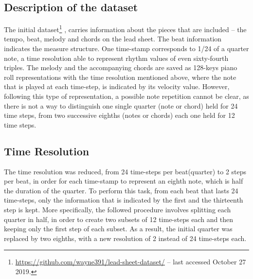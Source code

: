         \subsection{Description of the dataset} \label{subsec:initial_dataset}
        The initial dataset\footnote{\url{https://github.com/wayne391/lead-sheet-dataset/} -- last accessed October 27 2019.} \cite{liu2018lead}, carries information about the pieces that are included -- the tempo, beat, melody and chords on the lead sheet. The beat information indicates the measure structure. One time-stamp corresponds to 1/24 of a quarter note, a time resolution able to represent rhythm values of even sixty-fourth triples. The melody and the accompanying chords are saved as 128-keys piano roll representations with the time resolution mentioned above, where the note that is played at each time-step, is indicated by its velocity value. However, following this type of representation, a possible note repetition cannot be clear, as there is not a way to distinguish one single quarter (note or chord) held for 24 time steps, from two successive eighths (notes or chords) each one held for 12 time steps. 

        \subsection{Time Resolution} \label{subsec:time_resolution}
        The time resolution was reduced, from 24 time-steps per beat(quarter) to 2 steps per beat, in order for each time-stamp to represent an eighth note, which is half the duration of the quarter. To perform this task, from each beat that lasts 24 time-steps, only the information that is indicated by the first and the thirteenth step is kept. More specifically, the followed procedure involves splitting each quarter in half, in order to create two subsets of 12 time-steps each and then keeping only the first step of each subset. As a result, the initial quarter was replaced by two eighths, with a new resolution of 2 instead of 24 time-steps each.
        
